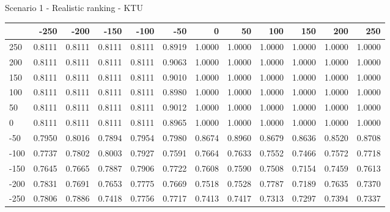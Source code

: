 Scenario 1 - Realistic ranking - KTU
\begin{tabular}{lrrrrrrrrrrr}
\toprule
{} &   -250 &   -200 &   -150 &   -100 &   -50  &    0   &    50  &    100 &    150 &    200 &    250 \\
\midrule
 250 & 0.8111 & 0.8111 & 0.8111 & 0.8111 & 0.8919 & 1.0000 & 1.0000 & 1.0000 & 1.0000 & 1.0000 & 1.0000 \\
 200 & 0.8111 & 0.8111 & 0.8111 & 0.8111 & 0.9063 & 1.0000 & 1.0000 & 1.0000 & 1.0000 & 1.0000 & 1.0000 \\
 150 & 0.8111 & 0.8111 & 0.8111 & 0.8111 & 0.9010 & 1.0000 & 1.0000 & 1.0000 & 1.0000 & 1.0000 & 1.0000 \\
 100 & 0.8111 & 0.8111 & 0.8111 & 0.8111 & 0.8980 & 1.0000 & 1.0000 & 1.0000 & 1.0000 & 1.0000 & 1.0000 \\
 50  & 0.8111 & 0.8111 & 0.8111 & 0.8111 & 0.9012 & 1.0000 & 1.0000 & 1.0000 & 1.0000 & 1.0000 & 1.0000 \\
 0   & 0.8111 & 0.8111 & 0.8111 & 0.8111 & 0.8965 & 1.0000 & 1.0000 & 1.0000 & 1.0000 & 1.0000 & 1.0000 \\
-50  & 0.7950 & 0.8016 & 0.7894 & 0.7954 & 0.7980 & 0.8674 & 0.8960 & 0.8679 & 0.8636 & 0.8520 & 0.8708 \\
-100 & 0.7737 & 0.7802 & 0.8003 & 0.7927 & 0.7591 & 0.7664 & 0.7633 & 0.7552 & 0.7466 & 0.7572 & 0.7718 \\
-150 & 0.7645 & 0.7665 & 0.7887 & 0.7906 & 0.7722 & 0.7608 & 0.7590 & 0.7508 & 0.7154 & 0.7459 & 0.7613 \\
-200 & 0.7831 & 0.7691 & 0.7653 & 0.7775 & 0.7669 & 0.7518 & 0.7528 & 0.7787 & 0.7189 & 0.7635 & 0.7370 \\
-250 & 0.7806 & 0.7886 & 0.7418 & 0.7756 & 0.7717 & 0.7413 & 0.7417 & 0.7313 & 0.7297 & 0.7394 & 0.7337 \\
\bottomrule
\end{tabular}

